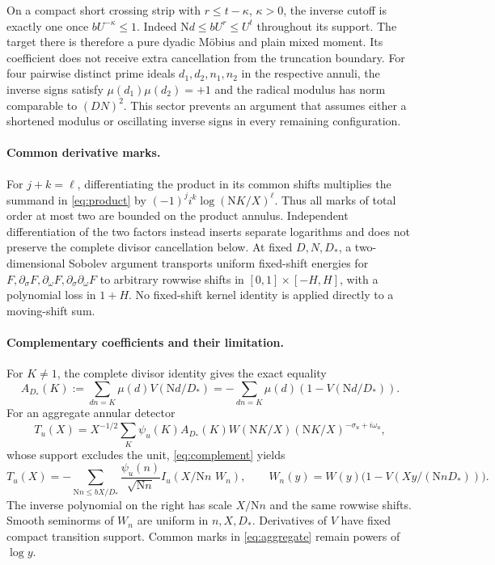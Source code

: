\documentclass[11pt]{article}
\newcommand{\N}{\mathrm N}
\begin{document}
On a compact short crossing strip with $r\le t-\kappa$, $\kappa>0$,
the inverse cutoff is exactly one once $bU^{-\kappa}\le1$.
Indeed $\N d\le bU^r\le U^t$ throughout its support.
The target there is therefore a pure dyadic M\"obius and plain mixed
moment. Its coefficient does not receive extra cancellation from the
truncation boundary.
For four pairwise distinct prime ideals $d_1,d_2,n_1,n_2$ in the
respective annuli, the inverse signs satisfy
$\mu(d_1)\mu(d_2)=+1$ and the radical modulus has norm comparable to
$(DN)^2$. This sector prevents an argument that assumes either a shortened
modulus or oscillating inverse signs in every remaining configuration.

\paragraph{Common derivative marks.}
For $j+k=\ell$, differentiating the product in its common shifts multiplies
the summand in \eqref{eq:product} by
$(-1)^j i^k\log(\N K/X)^\ell$.
Thus all marks of total order at most two are bounded on the product annulus.
Independent differentiation of the two factors instead inserts separate
logarithms and does not preserve the complete divisor cancellation below.
At fixed $D,N,D_*$, a two-dimensional Sobolev argument transports uniform
fixed-shift energies for $F,\partial_\sigma F,\partial_\omega F,
\partial_\sigma\partial_\omega F$ to arbitrary rowwise shifts
in $[0,1]\times[-H,H]$, with a polynomial loss in $1+H$.
No fixed-shift kernel identity is applied directly to a moving-shift sum.

\paragraph{Complementary coefficients and their limitation.}
For $K\ne1$, the complete divisor identity gives the exact equality
\begin{equation}\label{eq:complement}
 A_{D_*}(K):=\sum_{dn=K}\mu(d)V(\N d/D_*)
 =-\sum_{dn=K}\mu(d)(1-V(\N d/D_*)).
\end{equation}
For an aggregate annular detector
\[
 T_u(X)=X^{-1/2}\sum_K\psi_u(K)A_{D_*}(K)
       W(\N K/X)(\N K/X)^{-\sigma_u+i\omega_u},
\]
whose support excludes the unit, \eqref{eq:complement} yields
\begin{equation}\label{eq:aggregate}
 T_u(X)=-\sum_{\N n\le bX/D_*}\frac{\psi_u(n)}{\sqrt{\N n}}
        I_u(X/\N n\,\,W_n),\qquad
 W_n(y)=W(y)\bigl(1-V(Xy/(\N nD_*))\bigr).
\end{equation}
The inverse polynomial on the right has scale $X/\N n$ and the same
rowwise shifts. Smooth seminorms of $W_n$ are uniform in $n,X,D_*$.
Derivatives of $V$ have fixed compact transition support.
Common marks in \eqref{eq:aggregate} remain powers of $\log y$.
\end{document}
